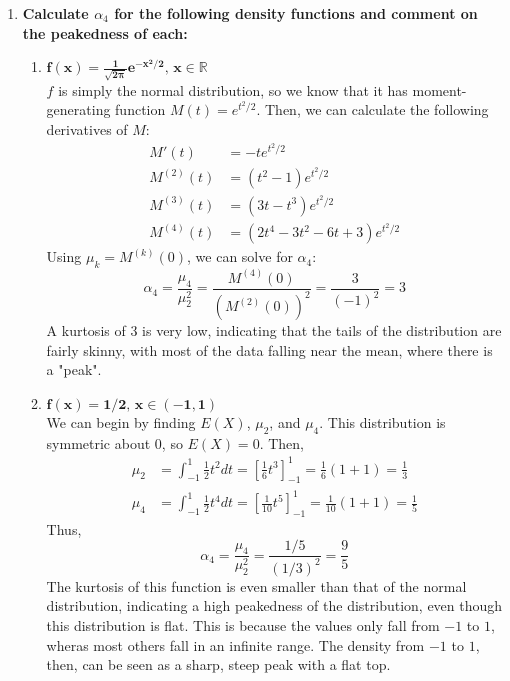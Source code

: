 \documentclass{article}
\newcommand{\R}{\mathbb{R}}
\begin{document}
\begin{enumerate}
	\item \textbf{Calculate $\alpha_4$ for the following density functions and comment on the peakedness of each:}
		\begin{enumerate}
			\item $\mathbf{f(x)=\frac{1}{\sqrt{2\pi}}e^{-x^2/2}\text{, }x\in\R}$
				\bigskip \\
				$f$ is simply the normal distribution, so we know that it has moment-generating function $M(t)=e^{t^2/2}$. Then, we can calculate the following derivatives of $M$:
				\begin{align*}
					M'(t) 		&= -te^{t^2/2}					\\
					M^{(2)}(t)	&= (t^2 - 1)e^{t^2/2}			\\
					M^{(3)}(t)	&= (3t-t^3)e^{t^2/2} 			\\
					M^{(4)}(t)	&= (2t^4-3t^2-6t+3)e^{t^2/2}
				\end{align*}
				Using $\mu_k=M^{(k)}(0)$, we can solve for $\alpha_4$:
				\[
					\alpha_4 = \dfrac{\mu_4}{\mu_2^2} = \dfrac{M^{(4)}(0)}{(M^{(2)}(0))^2} = \dfrac{3}{(-1)^2} = 3
				\]
				A kurtosis of 3 is very low, indicating that the tails of the distribution are fairly skinny, with most of the data falling near the mean, where there is a "peak". 
			
			\item $\mathbf{f(x)=1/2\text{, }x\in(-1,1)}$
				\bigskip \\
				We can begin by finding $E(X)$, $\mu_2$, and $\mu_4$. This distribution is symmetric about $0$, so $E(X)=0$. Then,
				\begin{align*}
					\mu_2 &= \int^1_{-1} \frac{1}{2}t^2dt = [\frac{1}{6}t^3]^1_{-1} = \frac{1}{6}(1+1) = \frac{1}{3}	\\
					\mu_4 &= \int^1_{-1} \frac{1}{2}t^4dt = [\frac{1}{10}t^5]^1_{-1} = \frac{1}{10}(1+1) = \frac{1}{5}
				\end{align*}
				Thus,
				\[
					\alpha_4 = \dfrac{\mu_4}{\mu_2^2} = \dfrac{1/5}{(1/3)^2} = \dfrac{9}{5}
				\]
				The kurtosis of this function is even smaller than that of the normal distribution, indicating a high peakedness of the distribution, even though this distribution is flat. This is because the values only fall from $-1$ to $1$, wheras most others fall in an infinite range. The density from $-1$ to $1$, then, can be seen as a sharp, steep peak with a flat top.
				

\end{enumerate}
\end{enumerate}
\end{document}
